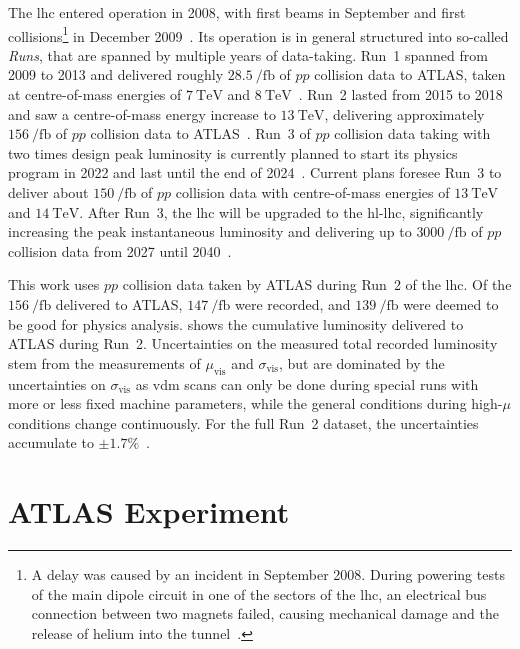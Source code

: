 The \gls{lhc} entered operation in 2008, with first beams in September and first collisions\footnote{A delay was caused by an incident in September 2008. During powering tests of the main dipole circuit in one of the sectors of the \gls{lhc}, an electrical bus connection between two magnets failed, causing mechanical damage and the release of helium into the tunnel~\cite{Bajko:1168025}.} in December 2009~\cite{startup}.
Its operation is in general structured into so-called \textit{Runs}, that are spanned by multiple years of data-taking. Run~1 spanned from 2009 to 2013 and delivered roughly $\SI{28.5}{\per\femto\barn}$ of $pp$ collision data to ATLAS, taken at centre-of-mass energies of $\SI{7}{\TeV}$ and $\SI{8}{\TeV}$~\cite{Aad:2011dr,Aad:1517411,Aaboud:2016hhf}.
Run~2 lasted from 2015 to 2018 and saw a centre-of-mass energy increase to $\SI{13}{\TeV}$, delivering approximately $\SI{156}{\per\femto\barn}$ of $pp$ collision data to ATLAS~\cite{ATLAS-CONF-2019-021}.
Run~3 of $pp$ collision data taking with two times design peak luminosity is currently planned to start its physics program in 2022 and last until the end of 2024~\cite{run3}.
Current plans foresee Run~3 to deliver about $\SI{150}{\per\femto\barn}$ of $pp$ collision data with centre-of-mass energies of $\SI{13}{\TeV}$ and $\SI{14}{\TeV}$.
After Run~3, the \gls{lhc} will be upgraded to the \gls{hl-lhc}, significantly increasing the peak instantaneous luminosity and delivering up to $\SI{3000}{\per\femto\barn}$ of $pp$ collision data from 2027 until 2040~\cite{run3,Apollinari:2284929}. 

This work uses $pp$ collision data taken by ATLAS during Run~2 of the \gls{lhc}. Of the $\SI{156}{\per\femto\barn}$ delivered to ATLAS, $\SI{147}{\per\femto\barn}$ were recorded, and $\SI{139}{\per\femto\barn}$ were deemed to be good for physics analysis.
 shows the cumulative luminosity delivered to ATLAS during Run~2.
Uncertainties on the measured total recorded luminosity stem from the measurements of $\mu_\mathrm{vis}$ and $\sigma_\mathrm{vis}$, but are dominated by the uncertainties on $\sigma_\mathrm{vis}$ as \gls{vdm} scans can only be done during special runs with more or less fixed machine parameters, while the general conditions during high-$\mu$ conditions change continuously.
For the full Run~2 dataset, the uncertainties accumulate to $\pm 1.7 \%$~\cite{ATLAS-CONF-2019-021}.

\section{ATLAS Experiment}\label{sec:atlas_experiment}

